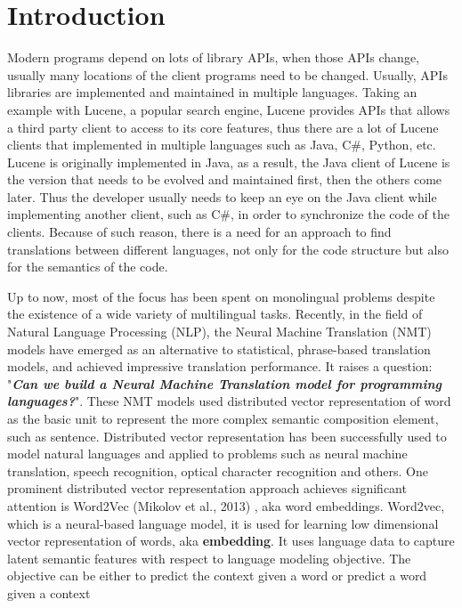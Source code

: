\section{Introduction}

Modern programs depend on lots of library APIs, when those APIs change, usually many locations of the client programs need to be changed. Usually, APIs libraries are implemented and maintained in multiple languages. Taking an example with Lucene, a popular search engine, Lucene provides APIs that allows a third party client to access to its core features, thus there are a lot of Lucene clients that implemented in multiple languages such as Java, C\#, Python, etc. Lucene is originally implemented in Java, as a result, the Java client of Lucene is the version that needs to be evolved and maintained first, then the others come later. Thus the developer usually needs to keep an eye on the Java client while implementing another client, such as C\#, in order to synchronize the code of the clients. Because of such reason, there is a need for an approach to find translations between different languages, not only for the code structure but also for the semantics of the code.

Up to now, most of the focus has been spent on monolingual problems despite the existence of a wide variety of multilingual tasks. Recently, in the field of Natural Language Processing (NLP), the Neural Machine Translation (NMT) models have emerged as an alternative to statistical, phrase-based translation models, and achieved impressive translation performance. It raises a question: "\textbf{\textit{Can we build a Neural Machine Translation model for programming languages?}}". These NMT models used distributed vector representation of word as the basic unit to represent the more complex semantic composition element, such as sentence. Distributed vector representation has been successfully used to model natural languages and applied to problems such as neural machine translation, speech recognition, optical character recognition and others. One prominent distributed vector representation approach achieves significant attention is Word2Vec (Mikolov et al., 2013) \cite{mikolov2013distributed}, aka word embeddings. Word2vec, which is a neural-based language model, it is used for learning low dimensional vector representation of words, aka \textbf{embedding}. It uses language data to capture latent semantic features with respect to language modeling objective. The objective can be either to predict the context given a word or predict a word given a context

